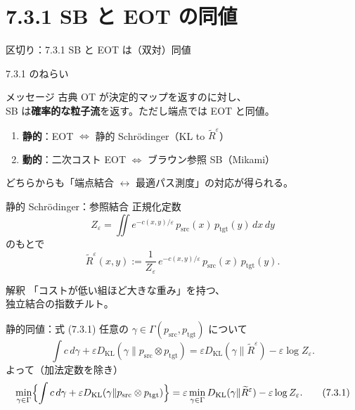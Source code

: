 \section{7.3.1 SB と EOT の同値}
\asmain
\begin{frame}{区切り：7.3.1 SB と EOT は（双対）同値}
    \tableofcontents[currentsection]
\end{frame}
\asmain
\begin{frame}{7.3.1 のねらい}
    \begin{block}{メッセージ}
        古典 OT が決定的マップを返すのに対し、\\
        SB は\textbf{確率的な粒子流}を返す。ただし端点では EOT と同値。
    \end{block}
    \begin{enumerate}
        \item \textbf{静的}：EOT $\Leftrightarrow$ 静的 Schrödinger（KL to $\widetilde R^\varepsilon$）
        \item \textbf{動的}：二次コスト EOT $\Leftrightarrow$ ブラウン参照 SB（Mikami）
    \end{enumerate}
    どちらからも「端点結合 $\leftrightarrow$ 最適パス測度」の対応が得られる。
\end{frame}
\asmain
\begin{frame}{静的 Schrödinger：参照結合}
    正規化定数
    \[
        Z_\varepsilon
        =
        \iint e^{-c(x,y)/\varepsilon}\,
        p_{\mathrm{src}}(x)\,p_{\mathrm{tgt}}(y)\,dx\,dy
    \]
    のもとで
    \[
        \widetilde R^\varepsilon(x,y)
        :=
        \frac{1}{Z_\varepsilon}\,
        e^{-c(x,y)/\varepsilon}\,
        p_{\mathrm{src}}(x)\,p_{\mathrm{tgt}}(y).
    \]
    \begin{exampleblock}{解釈}
        「コストが低い組ほど大きな重み」を持つ、\\
        独立結合の指数チルト。
    \end{exampleblock}
\end{frame}
\asmain
\begin{frame}{静的同値：式 (7.3.1)}
    任意の $\gamma\in\Gamma(p_{\mathrm{src}},p_{\mathrm{tgt}})$ について
    \[
        \int c\,d\gamma
        +
        \varepsilon D_{\mathrm{KL}}(\gamma\|p_{\mathrm{src}}\otimes p_{\mathrm{tgt}})
        =
        \varepsilon D_{\mathrm{KL}}(\gamma\|\widetilde R^\varepsilon)
        -
        \varepsilon\log Z_\varepsilon.
    \]
    よって（加法定数を除き）
    \[
        \min_{\gamma\in\Gamma}
        \Bigl\{
            \int c\,d\gamma
            +
            \varepsilon D_{\mathrm{KL}}(\gamma\|p_{\mathrm{src}}\otimes p_{\mathrm{tgt}})
        \Bigr\}
        =
        \varepsilon
        \min_{\gamma\in\Gamma}
        D_{\mathrm{KL}}(\gamma\|\widetilde R^\varepsilon)
        -
        \varepsilon\log Z_\varepsilon.
        \tag{7.3.1}
    \]
\end{frame}
